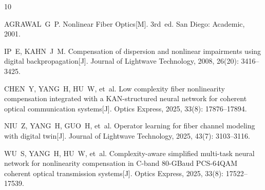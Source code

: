\documentclass[conference]{IEEEtran}
\begin{document}

\begin{thebibliography}{10}

AGRAWAL~G~P. Nonlinear Fiber Optics[M]. 3rd~ed. San Diego: Academic, 2001.

IP~E, KAHN~J~M. Compensation of dispersion and nonlinear impairments using digital backpropagation[J]. Journal of Lightwave Technology, 2008, 26(20): 3416--3425.

CHEN~Y, YANG~H, HU~W, et~al. Low complexity fiber nonlinearity compensation integrated with a KAN-structured neural network for coherent optical communication systems[J]. Optics Express, 2025, 33(8): 17876--17894.

NIU~Z, YANG~H, GUO~H, et~al. Operator learning for fiber channel modeling with digital twin[J]. Journal of Lightwave Technology, 2025, 43(7): 3103--3116.

WU~S, YANG~H, HU~W, et~al. Complexity-aware simplified multi-task neural network for nonlinearity compensation in C-band 80-GBaud PCS-64QAM coherent optical transmission systems[J]. Optics Express, 2025, 33(8): 17522--17539.

\end{thebibliography}
\end{document}
